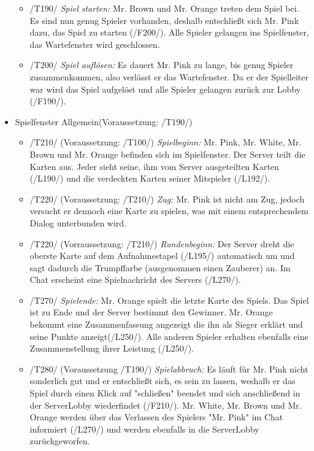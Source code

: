 \documentclass{article}
\begin{document}
\begin{itemize}
\begin{itemize}
		\item /T190/ \textit{Spiel starten:} Mr. Brown und Mr. Orange treten dem Spiel bei. Es sind nun genug Spieler vorhanden, deshalb entschließt sich Mr. Pink dazu, das Spiel zu starten (/F200/). Alle Spieler gelangen ins Spielfenster, das Wartefenster wird geschlossen.
		
		\item /T200/ \textit{Spiel auflösen:} Es dauert Mr. Pink zu lange, bis genug Spieler zusammenkommen, also verlässt er das Wartefenster. Da er der Spielleiter war wird das Spiel aufgelöst und alle Spieler gelangen zurück zur Lobby (/F190/).
		 
	\end{itemize}

	\item Spielfenster Allgemein(Voraussetzung: /T190/)
	
	\begin{itemize}
	
		\item /T210/ (Voraussetzung: /T100/) \textit{Spielbeginn:} Mr. Pink, Mr. White, Mr. Brown und Mr. Orange befinden sich im Spielfenster. Der Server teilt die Karten aus. Jeder sieht seine, ihm vom Server ausgeteilten Karten (/L190/) und die verdeckten Karten seiner Mitspieler (/L192/).  

		\item /T220/ (Voraussetzung: /T210/) \textit{Zug:} Mr. Pink ist nicht am Zug, jedoch versucht er dennoch eine Karte zu spielen, was mit einem entsprechendem Dialog  unterbunden wird.
		
		\item /T220/ (Vorraussetzung: /T210/) \textit{Rundenbeginn:} Der Server dreht die oberste Karte auf dem Aufnahmestapel (/L195/) automatisch um und sagt dadurch die Trumpffarbe (ausgenommen einen Zauberer) an. Im Chat erscheint eine Spielnachricht des Servers (/L270/).
	
		\item /T270/ \textit{Spielende:} Mr. Orange spielt die letzte Karte des Spiels. Das Spiel ist zu Ende und der Server bestimmt den Gewinner. Mr. Orange bekommt eine Zusammenfassung angezeigt die ihn als Sieger erklärt und seine Punkte anzeigt(/L250/). Alle anderen Spieler erhalten ebenfalls eine Zusammenstellung ihrer Leistung (/L250/).
		
		\item /T280/ (Voraussetzung /T190/) \textit{Spielabbruch:} Es läuft für Mr. Pink nicht sonderlich gut und er entschließt sich, es sein zu lassen, weshalb er das Spiel durch einen Klick auf "schließen" beendet und sich anschließend in der ServerLobby wiederfindet (/F210/). Mr. White, Mr. Brown und Mr. Orange werden über das Verlassen des Spielers "Mr. Pink" im Chat informiert (/L270/) und werden ebenfalls in die ServerLobby zurückgeworfen.
	

\end{itemize}
\end{itemize}
\end{document}
